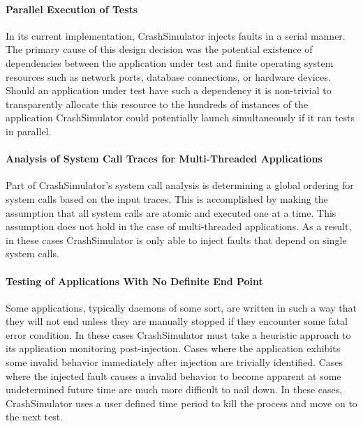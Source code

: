         \paragraph{Parallel Execution of Tests}

            In its current implementation, CrashSimulator injects faults in a serial manner. The primary cause of this
            design decision was the potential existence of dependencies between the application under test and finite
            operating system resources such as network ports, database connections, or hardware devices. Should an
            application under test have such a dependency it is non-trivial to transparently allocate this resource to
            the hundreds of instances of the application CrashSimulator could potentially launch simultaneously if it
            ran tests in parallel.

        \paragraph{Analysis of System Call Traces for Multi-Threaded Applications}

            Part of CrashSimulator's system call analysis is determining a global ordering for system calls based on the
            input traces. This is accomplished by making the assumption that all system calls are atomic and executed
            one at a time. This assumption does not hold in the case of multi-threaded applications. As a result, in
            these cases CrashSimulator is only able to inject faults that depend on single system calls.

        \paragraph{Testing of Applications With No Definite End Point}

            Some applications, typically daemons of some sort, are written in such a way that they will not end unless
            they are manually stopped if they encounter some fatal error condition. In these cases CrashSimulator must
            take a heuristic approach to its application monitoring post-injection. Cases where the application exhibits
            some invalid behavior immediately after injection are trivially identified. Cases where the injected fault
            causes a invalid behavior to become apparent at some undetermined future time are much more difficult to
            nail down. In these cases, CrashSimulator uses a user defined time period to kill the process and move on to
            the next test.


